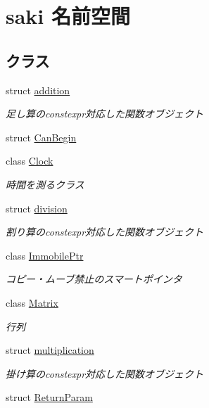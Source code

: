 \hypertarget{namespacesaki}{}\section{saki 名前空間}
\label{namespacesaki}
\subsection*{クラス}
\begin{DoxyCompactItemize}
\item 
struct \mbox{\hyperlink{structsaki_1_1addition}{addition}}
\begin{DoxyCompactList}\small\item\em 足し算のconstexpr対応した関数オブジェクト \end{DoxyCompactList}\item 
struct \mbox{\hyperlink{structsaki_1_1_can_begin}{Can\+Begin}}
\item 
class \mbox{\hyperlink{classsaki_1_1_clock}{Clock}}
\begin{DoxyCompactList}\small\item\em 時間を測るクラス \end{DoxyCompactList}\item 
struct \mbox{\hyperlink{structsaki_1_1division}{division}}
\begin{DoxyCompactList}\small\item\em 割り算のconstexpr対応した関数オブジェクト \end{DoxyCompactList}\item 
class \mbox{\hyperlink{classsaki_1_1_immobile_ptr}{Immobile\+Ptr}}
\begin{DoxyCompactList}\small\item\em コピー・ムーブ禁止のスマートポインタ \end{DoxyCompactList}\item 
class \mbox{\hyperlink{classsaki_1_1_matrix}{Matrix}}
\begin{DoxyCompactList}\small\item\em 行列 \end{DoxyCompactList}\item 
struct \mbox{\hyperlink{structsaki_1_1multiplication}{multiplication}}
\begin{DoxyCompactList}\small\item\em 掛け算のconstexpr対応した関数オブジェクト \end{DoxyCompactList}\item 
struct \mbox{\hyperlink{structsaki_1_1_return_param}{Return\+Param}}

\end{DoxyCompactItemize}

